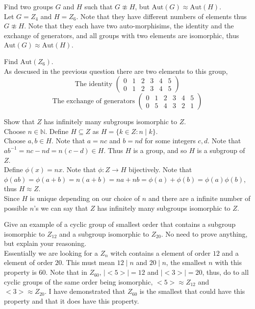 \documentclass[12pt]{article}
\makeatletter
\theoremstyle{homework}
\newenvironment{exercise}[1]
{\def\@currentlabel{#1}\exercisecore}
{\endexercisecore}
\newcommand{\Aut}{\ensuremath{\text{Aut}}}
\makeatother
\begin{document}
\begin{exercise}{6.12}
Find two groups $G$ and $H$ such that $G \not\approx H$, but $\Aut(G) \approx \Aut(H)$.\\
Let $G=Z_4$ and $H=Z_6$.  Note that they have different numbers of elements thus $G \not\approx H$.  Note that they each have two auto-morphisims, the identity and the exchange of generators, and all groups with two elements are isomorphic, thus $\Aut(G) \approx \Aut(H)$.
\end{exercise}

\begin{exercise}{6.14}
Find $\Aut(Z_6 )$.\\
As descused in the previous question there are two elements to this group,
$$\text{The identity }\begin{pmatrix}
0&1&2&3&4&5\\
0&1&2&3&4&5
\end{pmatrix}$$
$$\text{The exchange of generators }\begin{pmatrix}
0&1&2&3&4&5\\
0&5&4&3&2&1
\end{pmatrix}$$
\end{exercise}

\begin{exercise}{6.20}
Show that $Z$ has infinitely many subgroups isomorphic to $Z$.\\
Choose $n\in \mathbb{N}$.  Define $H\subseteq Z$ as $H=\{k\in Z : n\mid k\}$.\\
Choose $a,b\in H$.  Note that $a=nc$ and $b=nd$ for some integers $c,d$.  Note that $ab^{-1}=nc-nd=n(c-d)\in H$.  Thus $H$ is a group, and so $H$ is a subgroup of $Z$.\\
Define $\phi(x)=nx$.  Note that $\phi: Z\rightarrow H$ bijectively.  Note that $\phi(ab)=\phi(a+b)=n(a+b)=na+nb=\phi(a)+\phi(b)=\phi(a)\phi(b)$, thus $H\approx Z$.\\
Since $H$ is unique depending on our choice of $n$ and there are a infinite number of possible $n$'s we can say that $Z$ has infinitely many subgroups isomorphic to $Z$.
\end{exercise}

\begin{exercise}{6.23}
Give an example of a cyclic group of smallest order that contains a subgroup isomorphic to $Z_{12}$ and a subgroup isomorphic to $Z_{20}$.  No need to prove anything, but explain your reasoning.\\
Essentially we are looking for a $Z_n$ witch contains a element of order $12$ and a element of order $20$.  This must mean $12\mid n$ and $20\mid n$, the smallest $n$ with this property is $60$.  Note that in $Z_{60}$, $|<5>|=12$ and $|<3>|=20$, thus, do to all cyclic groups of the same order being isomorphic, $<5>\approx Z_{12}$ and $<3>\approx Z_{20}$.  I have demonstrated that $Z_{60}$ is the smallest that could have this property and that it does have this property.
\end{exercise}
\end{document}
